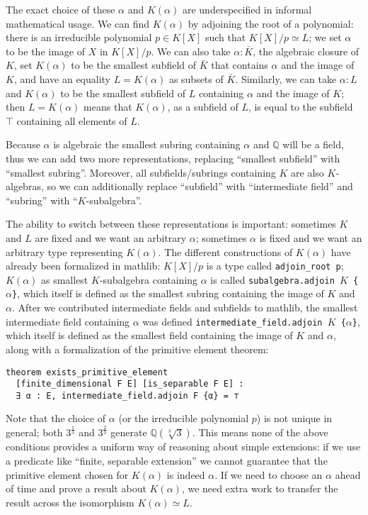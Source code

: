 \documentclass[a4paper,USenglish,cleveref, autoref, thm-restate]{lipics-v2021}
\newcommand{\lean}[1]{\texttt{#1}\xspace} %
\newcommand{\mathlib}{\textsf{mathlib}\xspace}
\newcommand{\Q}{\mathbb{Q}}
\begin{document}
The exact choice of these $\alpha$ and $K(\alpha)$ are underspecified in informal mathematical usage.
We can find $K(\alpha)$ by adjoining the root of a polynomial: there is an irreducible polynomial $p \in K[X]$ such that $K[X] / p \simeq L$; we set $\alpha$ to be the image of $X$ in $K[X] / p$.
We can also take $\alpha : \bar{K}$, the algebraic closure of $K$, set $K(\alpha)$ to be the smallest subfield of $\bar{K}$ that contains $\alpha$ and the image of $K$, and have an equality $L = K(\alpha)$ as subsets of $\bar{K}$.
Similarly, we can take $\alpha : L$ and $K(\alpha)$ to be the smallest subfield of $L$ containing $\alpha$ and the image of $K$; then $L = K(\alpha)$ means that $K(\alpha)$, as a subfield of $L$, is equal to the subfield $\top$ containing all elements of $L$.

Because $\alpha$ is algebraic the smallest subring containing $\alpha$ and $\Q$ will be a field, thus we can add two more representations, replacing ``smallest subfield'' with ``smallest subring''.
Moreover, all subfields/subrings containing $K$ are also $K$-algebras, so we can additionally replace ``subfield'' with ``intermediate field'' and ``subring'' with ``$K$-subalgebra''.

The ability to switch between these representations is important: sometimes $K$ and $L$ are fixed and we want an arbitrary $\alpha$; sometimes $\alpha$ is fixed and we want an arbitrary type representing $K(\alpha)$.
The different constructions of $K(\alpha)$ have already been formalized in \mathlib:
$K[X] / p$ is a type called \lean{adjoin\_root p};
$K(\alpha)$ as smallest $K$-subalgebra containing $\alpha$ is called \lean{subalgebra.adjoin $K$ \{$\alpha$\}},
which itself is defined as the smallest subring containing the image of $K$ and $\alpha$.
After we contributed intermediate fields and subfields to \mathlib,
the smallest intermediate field containing $\alpha$ was defined \lean{intermediate\_field.adjoin $K$ \{$\alpha$\}},
which itself is defined as the smallest field containing the image of $K$ and $\alpha$,
along with a formalization of the primitive element theorem:
\begin{lstlisting}
theorem exists_primitive_element
  [finite_dimensional F E] [is_separable F E] :
  ∃ α : E, intermediate_field.adjoin F {α} = ⊤
\end{lstlisting}

Note that the choice of $\alpha$ (or the irreducible polynomial $p$) is not unique in general; both $3^\frac{1}{3}$ and $3^\frac{2}{3}$ generate $\Q(\sqrt[3]{3})$.
This means none of the above conditions provides a uniform way of reasoning about simple extensions:
if we use a predicate like ``finite, separable extension'' we cannot guarantee that the primitive element chosen for $K(\alpha)$ is indeed $\alpha$.
If we need to choose an $\alpha$ ahead of time and prove a result about $K(\alpha)$, we need extra work to transfer the result across the isomorphism $K(\alpha) \simeq L$.
\end{document}
